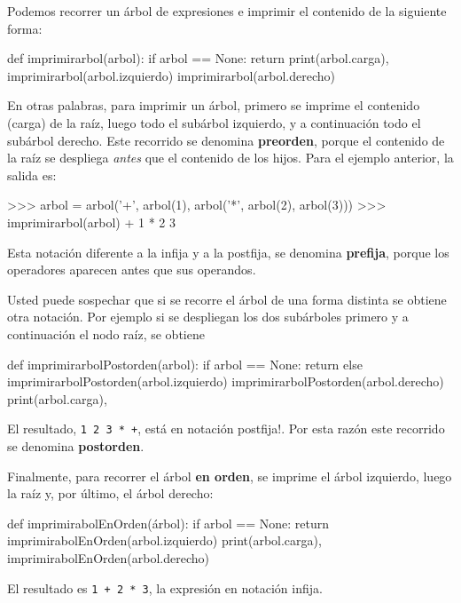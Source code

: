 Podemos recorrer un árbol de expresiones e imprimir el contenido de
la siguiente forma:

\beforeverb 
\begin{pythoncode}
def imprimirarbol(arbol):
  if arbol == None: 
     return
  print(arbol.carga),
  imprimirarbol(arbol.izquierdo)
  imprimirarbol(arbol.derecho)
\end{pythoncode}
\afterverb {} 

En otras palabras, para imprimir un árbol, primero se imprime el contenido
(carga) de la raíz, luego todo el subárbol izquierdo, y a continuación
todo el subárbol derecho. Este recorrido se denomina \textbf{preorden},
porque el contenido de la raíz se despliega {\em antes} que el
contenido de los hijos. Para el ejemplo anterior, la salida es:

\beforeverb 
\begin{pyconcode}
>>> arbol = arbol('+', arbol(1), 
                       arbol('*', arbol(2), arbol(3)))
>>> imprimirarbol(arbol)
+ 1 * 2 3
\end{pyconcode}
\afterverb Esta notación diferente a la infija y a la postfija, se
denomina \textbf{prefija}, porque los operadores aparecen antes que
sus operandos.

Usted puede sospechar que si se recorre el árbol de una forma distinta
se obtiene otra notación. Por ejemplo si se despliegan los dos subárboles
primero y a continuación el nodo raíz, se obtiene

\beforeverb 
\begin{pythoncode}
def imprimirarbolPostorden(arbol):
  if arbol == None: 
     return
  else 
     imprimirarbolPostorden(arbol.izquierdo)
     imprimirarbolPostorden(arbol.derecho)
     print(arbol.carga),
\end{pythoncode}
\afterverb {}  El resultado, \texttt{1
2 3 {*} +}, está en notación postfija!. Por esta razón este recorrido
se denomina \textbf{postorden}.

Finalmente, para recorrer el árbol \textbf{en orden}, se imprime el
árbol izquierdo, luego la raíz y, por último, el árbol derecho:

\beforeverb 
\begin{pythoncode}
def imprimirabolEnOrden(árbol):
  if arbol == None: 
     return
  imprimirabolEnOrden(arbol.izquierdo)
  print(arbol.carga),
  imprimirabolEnOrden(arbol.derecho)
\end{pythoncode}
\afterverb El resultado es \texttt{1 + 2 {*} 3}, la expresión en
notación infija.

